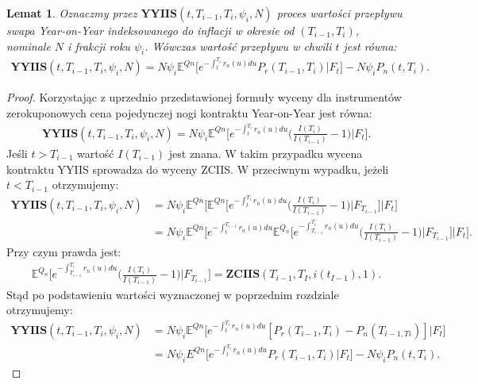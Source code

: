 \documentclass{mini}
\theoremstyle{mythstyle}
\newtheorem{Lemat}{Lemat}[chapter]
\begin{document}
	\begin{Lemat}
			Oznaczmy przez $\textbf{YYIIS}(t,T_{i-1},T_{i},\psi_i,N)$ proces wartości przepływu swapa Year-on-Year indeksowanego do inflacji w okresie od $(T_{i-1}, T_i)$, nominale $N$ i frakcji roku $\psi_i$. Wówczas wartość przepływu w chwili $t$ jest równa: 
			\begin{eqnarray}
			\textbf{YYIIS} (t,T_{i-1},T_i,\psi_i,N) = N \psi_i \mathbb{E}^{Qn} \bigg[ e^{-\int_t^{T_i}r_n(u)du} P_r(T_{i-1},T_i) \bigg| F_t \bigg] - N \psi_i P_n(t,T_i). 
			\end{eqnarray}
	\end{Lemat}
	\begin{proof}
		Korzystając z uprzednio przedstawionej formuły wyceny dla instrumentów zerokuponowych cena pojedynczej nogi kontraktu Year-on-Year jest równa:
		\begin{eqnarray}
			\textbf{YYIIS} (t,T_{i-1},T_i,\psi_i,N) = N \psi_i \mathbb{E}^{Qn} \bigg[e^{-\int_t^{T_i}r_n(u)du}\bigg(\frac{I(T_i)}{I(T_{i-1})}-1\bigg) \bigg| F_t\bigg].
		\end{eqnarray}
		Jeśli $t > T_{i-1}$ wartość $I(T_{i-1})$ jest znana. W takim przypadku wycena kontraktu YYIIS sprowadza do wyceny ZCIIS. W przeciwnym wypadku, jeżeli $t < T_{i-1}$ otrzymujemy:
		\begin{align*}
		\textbf{YYIIS} (t,T_{i-1},T_i,\psi_i,N) &= N \psi_i \mathbb{E}^{Qn} \bigg[ \mathbb{E}^{Qn} \bigg[e^{-\int_t^{T_i}r_n(u)du}\bigg(\frac{I(T_i)}{I(T_{i-1})}-1\bigg) \bigg| F_{T_{i-1}}\bigg] \bigg| F_t \bigg]\\
		&= N \psi_i \mathbb{E}^{Qn} \bigg[ e^{-\int_t^{T_{i-1}}r_n(u)du} \mathbb{E}^{Q_n} \bigg[e^{-\int_{T_{i-1}}^{T_i}r_n(u)du}\bigg(\frac{I(T_i)}{I(T_{i-1})}-1\bigg) \bigg| F_{T_{i-1}}\bigg] \bigg| F_t \bigg].
		\end{align*}
		Przy czym prawda jest:
		\begin{eqnarray*}
			\mathbb{E}^{Q_n} \bigg[e^{-\int_{T_{i-1}}^{T_i}r_n(u)du}\bigg(\frac{I(T_i)}{I(T_{i-1})}-1\bigg) \bigg| F_{T_{i-1}}\bigg] = \textbf{ZCIIS} (T_{i-1},T_I,i(t_{I-1}),1).
		\end{eqnarray*}
		Stąd po podstawieniu wartości wyznaczonej w poprzednim rozdziale otrzymujemy:
		\begin{align*}
		\textbf{YYIIS} (t,T_{i-1},T_i,\psi_i,N) &= N \psi_i \mathbb{E}^{Qn} \bigg[ e^{-\int_t^{T_i}r_n(u)du} [P_r(T_{i-1},T_i) - P_n(T_{i-1,Ti})] \bigg| F_t \bigg]\\
		&= N \psi_i E^{Qn} \bigg[ e^{-\int_t^{T_i}r_n(u)du} P_r(T_{i-1},T_i) \bigg| F_t \bigg] - N \psi_i P_n(t,T_i). 
		\end{align*}
	\end{proof}
\end{document}

